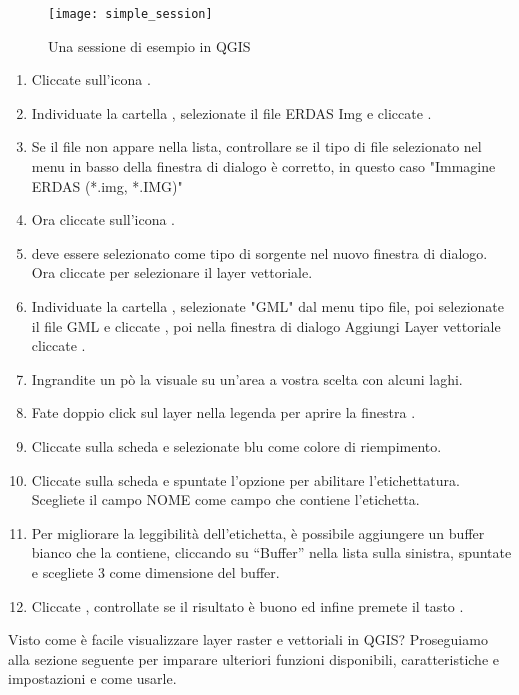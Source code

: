 \begin{figure}[ht]
   \begin{center}
   \caption{Una sessione di esempio in QGIS \nixcaption}\label{fig:simple_session}\smallskip
   \texttt{[image: simple\_session]}
\end{center}  
\end{figure}


\begin{enumerate}
\item Cliccate sull'icona . 
\item Individuate la cartella ,
selezionate il file ERDAS Img  e cliccate
. 
\item Se il file non appare nella lista, controllare se il tipo di file selezionato 
nel menu in basso della finestra di dialogo è corretto, in questo caso "Immagine ERDAS (*.img, *.IMG)"
\item Ora cliccate sull'icona . 
\item {} deve essere selezionato come tipo di sorgente nel nuovo
 finestra di dialogo. Ora cliccate  per selezionare il 
layer vettoriale.
\item Individuate la cartella , selezionate "GML" 
dal menu tipo file, poi selezionate il file GML  
e cliccate , poi nella finestra di dialogo Aggiungi Layer vettoriale cliccate . 
\item Ingrandite un pò la visuale su un'area a vostra scelta con alcuni laghi. 
\item Fate doppio click sul layer  nella legenda per
aprire la finestra . 
\item Cliccate sulla scheda  e selezionate blu come
colore di riempimento. 
\item Cliccate sulla scheda  e spuntate l'opzione  per abilitare l'etichettatura. Scegliete il campo NOME come campo che contiene l'etichetta.
\item Per migliorare la leggibilità dell'etichetta, è possibile aggiungere un buffer bianco che la contiene,
cliccando su ``Buffer'' nella lista sulla sinistra, spuntate  e scegliete 3 come dimensione del buffer.
\item Cliccate , controllate se il risultato è buono ed infine 
premete il tasto .
\end{enumerate} 

Visto come è facile visualizzare layer raster e vettoriali in QGIS?
Proseguiamo alla sezione seguente per imparare ulteriori funzioni
disponibili, caratteristiche e impostazioni e come usarle.
